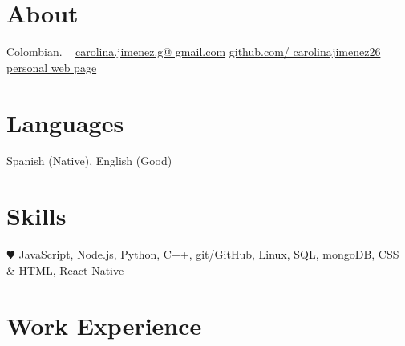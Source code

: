 \documentclass[]{friggeri-cv}
\begin{document}
       {}


\begin{aside}
  \section{About}
    Colombian.
    ~
    \href{mailto:carolina.jimenez.g@gmail.com}{carolina.jimenez.g@
    gmail.com}
    \href{https://github.com/carolinajimenez26}{github.com/
    carolinajimenez26}
    \href{https://carolinajimenez26.github.io/}{personal web page}
  \section{Languages}
    Spanish (Native), English (Good)
  \section{Skills}
    {\color{red} $\varheartsuit$} JavaScript, Node.js,
    Python, C++, git/GitHub, Linux, SQL, mongoDB,
    CSS \& HTML, React Native
\end{aside}

\section{Work Experience}
\end{document}
